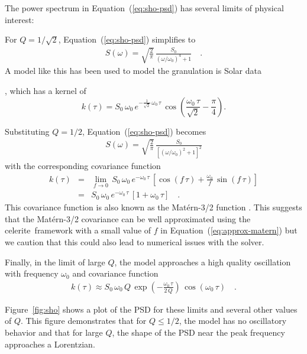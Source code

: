 \documentclass[manuscript, letterpaper]{aastex6}
\newcommand{\project}[1]{\textsf{#1}}
\newcommand{\celerite}{\project{celerite}}
\newcommand{\figureref}[1]{\ref{fig:#1}}
\newcommand{\Figure}[1]{Figure~\figureref{#1}}
\renewcommand{\eqref}[1]{\ref{eq:#1}}
\newcommand{\Eq}[1]{Equation~(\eqref{#1})}
\newcommand{\eq}[1]{\Eq{#1}}
\newcommand{\eqlabel}[1]{\label{eq:#1}}
\begin{document}
The power spectrum in \eq{sho-psd} has several limits of physical interest:
\begin{itemize}

{\item For $Q = 1/\sqrt{2}$, \eq{sho-psd} simplifies to
\begin{eqnarray}\eqlabel{granulation-psd}
S(\omega) = \sqrt{\frac{2}{\pi}}\,\frac{S_0}{(\omega/\omega_0)^4+1} \quad.
\end{eqnarray}
A model like this has been used to model the granulation is Solar data
\citep{Michel:2009}}, which has a kernel of
\begin{equation}
k(\tau) = S_0\,\omega_0\,e^{-\frac{1}{\sqrt{2}}\,\omega_0\,\tau}\,
    \cos{\left(\frac{\omega_0\,\tau}{\sqrt{2}}-\frac{\pi}{4}\right)}.
\end{equation}

{\item Substituting $Q = 1/2$, \eq{sho-psd} becomes
\begin{eqnarray}
S(\omega) =
    \sqrt{\frac{2}{\pi}}\,\frac{S_0}{\left[(\omega/\omega_0)^2+1\right]^2}
\end{eqnarray}
with the corresponding covariance function
\begin{eqnarray}\eqlabel{approx-matern}
k(\tau) &=& \lim_{f \to 0}\,
    S_0\,\omega_0\,e^{-\omega_0\,\tau}\,
    \left[\cos(f\,\tau) + \frac{\omega_0}{f}\,\sin(f\,\tau)\right] \\
&=& S_0\,\omega_0\,e^{-\omega_0\,\tau}\,[1+\omega_0\,\tau] \quad.
\end{eqnarray}
This covariance function is also known as the Mat\'ern-3/2 function
\citep{Rasmussen:2006}.
This suggests that the Mat\'ern-3/2 covariance can be well approximated using
the \celerite\ framework with a small value of $f$ in \eq{approx-matern} but we
caution that this could also lead to numerical issues with the solver.
}

{\item Finally, in the limit of large $Q$, the model approaches a high
    quality oscillation with frequency $\omega_0$ and covariance function
\begin{eqnarray}
k(\tau) \approx
    S_0\,\omega_0\,Q\,
    \exp\left(-\frac{\omega_0\,\tau}{2\,Q}\right)\,
    \cos\left(\omega_0\,\tau\right) \quad.
\end{eqnarray}}

\end{itemize}
\Figure{sho} shows a plot of the PSD for these limits and several other values
of $Q$.
This figure demonstrates that for $Q \le 1/2$, the model has no oscillatory
behavior and that for large $Q$, the shape of the PSD near the peak frequency
approaches a Lorentzian.
\end{document}

